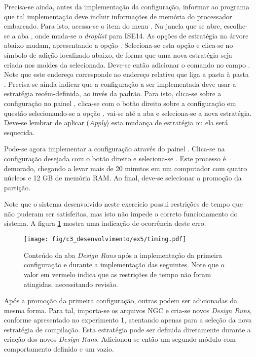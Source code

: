 \documentclass[11pt,a4paper,oneside]{book}
\begin{document}
Precisa-se ainda, antes da implementação da configuração, informar ao programa que tal implementação deve incluir informações de memória do processador embarcado.
Para isto, acessa-se o item  do menu .
Na janela que se abre, escolhe-se a aba , onde muda-se o \textit{droplist}  para ISE14.
As opções de estratégia na árvore abaixo mudam, apresentando a opção .
Seleciona-se esta opção e clica-se no símbolo de adição localizado abaixo, de forma que uma nova estratégia seja criada nos moldes da selecionada.
Deve-se então adicionar o comando  no campo .
Note que este endereço corresponde ao endereço relativo que liga a pasta  à pasta .
Precisa-se ainda indicar que a configuração a ser implementada deve usar a estratégia recém-definida, ao invés da padrão.
Para isto, clica-se sobre a configuração no painel , clica-se com o botão direito sobre a configuração em questão selecionando-se a opção , vai-se até a aba  e seleciona-se a nova estratégia.
Deve-se lembrar de aplicar (\textit{Apply}) esta mudança de estratégia ou ela será esquecida.

Pode-se agora implementar a configuração através do painel .
Clica-se na configuração desejada com o botão direito e seleciona-se .
Este processo é demorado, chegando a levar mais de 20 minutos em um computador com quatro núcleos e 12 GB de memória RAM.
Ao final, deve-se selecionar a promoção da partição.

Note que o sistema desenvolvido neste exercício possui restrições de tempo que não puderam ser satisfeitas, mas isto não impede o correto funcionamento do sistema.
A figura \ref{fig:ex5:timing} mostra uma indicação de ocorrência deste erro.

\begin{figure}[htp]
\centering
\texttt{[image: fig/c3\_desenvolvimento/ex5/timing.pdf]}
\caption{Conteúdo da aba \textit{Design Runs} após a implementação da primeira configuração e durante a implementação das seguintes. Note que o valor em vermelo indica que as restrições de tempo não foram atingidas, necessitando revisão.}
\label{fig:ex5:timing}
\end{figure}

Após a promoção da primeira configuração, outras podem ser adicionadas da mesma forma.
Para tal, importa-se os arquivos NGC e cria-se novos \textit{Design Runs}, conforme apresentado no experimento 1, atentando apenas para a seleção da nova estratégia de compilação.
Esta estratégia pode ser definida diretamente durante a criação dos novos \textit{Design Runs}.
Adicionou-se então um segundo módulo com comportamento definido e um vazio.
\end{document}
